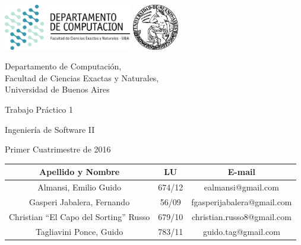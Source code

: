 \documentclass[a4paper, 10pt, twoside]{article}
\newcommand{\titulo}{Trabajo Práctico 1}
\newcommand{\materia}{Ingeniería de Software II}
\newcommand{\cuatrimestre}{Primer Cuatrimestre de 2016}
\begin{document}


\thispagestyle{caratula}

\begin{center}

\includegraphics[height=2cm]{DC.png} 
\hfill
\includegraphics[height=2cm]{UBA.jpg} 

\vspace{2cm}

Departamento de Computación,\\
Facultad de Ciencias Exactas y Naturales,\\
Universidad de Buenos Aires

\vspace{4cm}

\begin{Huge}
\titulo
\end{Huge}

\vspace{0.5cm}

\begin{Large}
\materia
\end{Large}

\vspace{1cm}

\cuatrimestre

\vspace{4cm}

\begin{tabular}{|c|c|c|}
\hline
Apellido y Nombre & LU & E-mail\\
\hline
Almansi, Emilio Guido          & 674/12         & ealmansi@gmail.com\\
Gasperi Jabalera, Fernando     & 56/09            & fgasperijabalera@gmail.com\\
Christian ``El Capo del Sorting'' Russo               & 679/10         & christian.russo8@gmail.com\\
Tagliavini Ponce, Guido       & 783/11            & guido.tag@gmail.com\\
\hline
\end{tabular}

\end{center}
\end{document}
